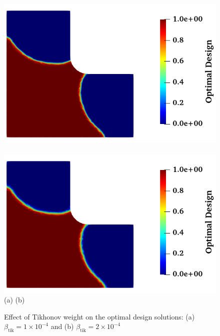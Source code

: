 \documentclass[pdf-a,balance,colorlinks,upint,subscriptcorrection,varvw,mathalfa=cal=boondoxo, spanish,french,vietnamese,russian,greek]{asmeconf}
\begin{document}
\begin{figure}[h]
\centering
\includegraphics[width=0.44\linewidth]{Figures/Tikhonov_1.png} ~  \includegraphics[width=0.44\linewidth]{Figures/Tikhonov_2.png}\\
(a) \hspace{1.3 in} (b)\\
\caption{Effect of Tikhonov weight on the optimal design solutions: (a) $\beta_{\text{tik}} = 1 \times 10^{-4}$ and (b) $\beta_{\text{tik}} = 2 \times 10^{-4}$}\label{fig:Tikhonov}
\end{figure}
\end{document}
